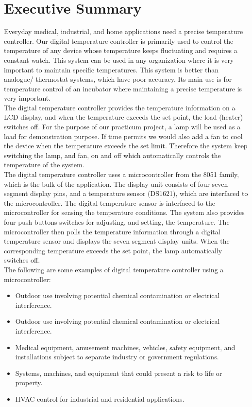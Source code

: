 \documentclass[11pt]{article}
\begin{document}
\section*{Executive Summary}
Everyday medical, industrial, and home applications need a precise temperature controller. Our digital temperature controller is primarily used to control the temperature of any device whose temperature keeps fluctuating and requires a constant watch. This system can be used in any organization where it is very important to maintain specific temperatures. This system is better than analogue/ thermostat systems, which have poor accuracy. Its main use is for temperature control of an incubator where maintaining a precise temperature is very important.\\
The digital temperature controller provides the temperature information on a LCD display, and when the temperature exceeds the set point, the load (heater) switches off. For the purpose of our practicum project, a lamp will be used as a load for demonstration purpose. If time permits we would also add a fan to cool the device when the temperature exceeds the set limit. Therefore the system keep switching the lamp, and fan, on and off which automatically controls the temperature of the system.\\
The digital temperature controller uses a microcontroller from the 8051 family, which is the bulk of the application. The display unit consists of four seven segment display pins, and a temperature sensor (DS1621), which are interfaced to the microcontroller. The digital temperature sensor is interfaced to the microcontroller for sensing the temperature conditions. The system also provides four push buttons switches for adjusting, and setting, the temperature. The microcontroller then polls the temperature information through a digital temperature sensor and displays the seven segment display units. When the corresponding temperature exceeds the set point, the lamp automatically switches off.\\
The following are some examples of digital temperature controller using a microcontroller:
\begin{itemize}
    \item Outdoor use involving potential chemical contamination or electrical interference.
    \item Outdoor use involving potential chemical contamination or electrical interference.
    \item Medical equipment, amusement machines, vehicles, safety equipment, and installations subject to separate industry or government regulations.
    \item Systems, machines, and equipment that could present a risk to life or property.
    \item HVAC control for industrial and residential applications.
\end{itemize}
\end{document}
